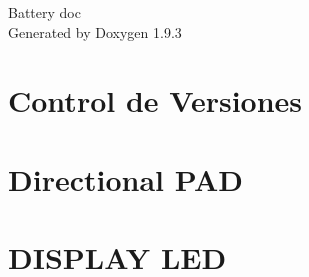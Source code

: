 \documentclass[twoside]{book}
\newcommand{\+}{\discretionary{\mbox{\scriptsize$\hookleftarrow$}}{}{}}
\newcommand{\clearemptydoublepage}{%
    \newpage{\pagestyle{empty}\cleardoublepage}%
  }
\begin{document}
  \raggedbottom
    \hypersetup{pageanchor=false,
                bookmarksnumbered=true,
                pdfencoding=unicode
               }
  \begin{titlepage}
  \vspace*{7cm}
  \begin{center}%
  {\Large Battery doc}\\
  \vspace*{1cm}
  {\large Generated by Doxygen 1.9.3}\\
  \end{center}
  \end{titlepage}
  \clearemptydoublepage
  \tableofcontents
  \clearemptydoublepage
  \hypersetup{pageanchor=true}
\chapter{Control de Versiones}
\label{md__c___users__javi__team__dropbox__javi__rodriguez__workspace_2__p_r_o_y_e_c_t_o_s__bitbucket_0180cf71382fe23c828431681a640ff44}

\chapter{Directional PAD}
\label{md__c___users__javi__team__dropbox__javi__rodriguez__workspace_2__p_r_o_y_e_c_t_o_s__bitbucket_04225b1ce24e7be95cc3182383dc9aec7}

\chapter{DISPLAY LED}
\label{md__c___users__javi__team__dropbox__javi__rodriguez__workspace_2__p_r_o_y_e_c_t_o_s__bitbucket_08b63da1a35cb4fb33b1f3279d3fc6051}

\end{document}
